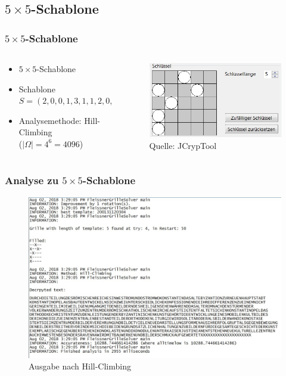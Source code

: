 \documentclass{beamer}
\begin{document}
\subsection{\texorpdfstring{$5 \times 5$-Schablone}{5 × 5-Schablone}} 
\begin{frame}
\frametitle{$5 \times 5$-Schablone}
\begin{columns}
\begin{column}{4cm}
\vspace{1cm}
\begin{itemize}
\item $5 \times 5$-Schablone
\item Schablone $S=(2,0,0,1,3,1,1,2,0,3,0,4)$
\item Analysemethode: Hill-Climbing \\($|\Omega|=4^6= 4096$)
\end{itemize}
\vspace{3cm} 
\end{column}
\hspace{0.5cm}
\begin{column}{5cm}
\begin{figure}
\includegraphics[scale=0.65]{Schablone5mal5.jpg}
\caption{Quelle: JCrypTool}
\end{figure}
\vspace{1cm}
\end{column}
\end{columns}
\end{frame}


\begin{frame}
\frametitle{Analyse zu $5 \times 5$-Schablone}
\begin{figure}
\includegraphics[scale=0.4]{Ausgabe5Mal5.jpg} 
\caption{Ausgabe nach Hill-Climbing}
\end{figure}
\end{frame}
\end{document}
